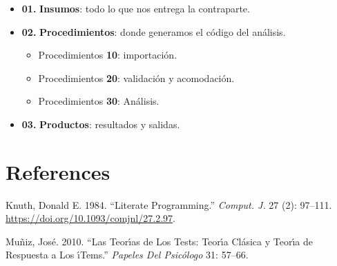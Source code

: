 \documentclass[
  letterpaper,
  DIV=11,
  numbers=noendperiod]{scrreprt}
\newlength{\cslhangindent}
\newenvironment{CSLReferences}[2] %
 {\begin{list}{}{%
  \setlength{\itemindent}{0pt}
  \setlength{\leftmargin}{0pt}
  \setlength{\parsep}{0pt}
  \ifodd #1
   \setlength{\leftmargin}{\cslhangindent}
   \setlength{\itemindent}{-1\cslhangindent}
  \fi
  \setlength{\itemsep}{#2\baselineskip}}}
 {\end{list}}
\begin{document}
\begin{itemize}
\item
  \textbf{01.} \textbf{Insumos}: todo lo que nos entrega la contraparte.
\item
  \textbf{02.} \textbf{Procedimientos}: donde generamos el código del
  análisis.

  \begin{itemize}
  \item
    Procedimientos \textbf{10}: importación.
  \item
    Procedimientos \textbf{20}: validación y acomodación.
  \item
    Procedimientos \textbf{30}: Análisis.
  \end{itemize}
\item
  \textbf{03.} \textbf{Productos}: resultados y salidas.
\end{itemize}


\chapter*{References}\label{references}


\label{refs}
\begin{CSLReferences}{1}{0}
Knuth, Donald E. 1984. {``Literate Programming.''} \emph{Comput. J.} 27
(2): 97--111. \url{https://doi.org/10.1093/comjnl/27.2.97}.

Muñiz, José. 2010. {``Las Teor{ı́}as de Los Tests: Teor{ı́}a Cl{á}sica y
Teor{ı́}a de Respuesta a Los {ı́}Tems.''} \emph{Papeles Del Psic{ó}logo}
31: 57--66.

\end{CSLReferences}
\end{document}
